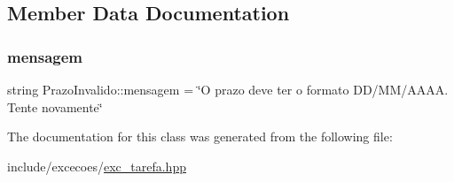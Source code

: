 \subsection{Member Data Documentation}
\mbox{\label{classPrazoInvalido_af2bb20a8cc0b09f0b348e0ea2f9d18e8}} 
\subsubsection{\texorpdfstring{mensagem}{mensagem}}
{\footnotesize\ttfamily string Prazo\+Invalido\+::mensagem = \char`\"{}O prazo deve ter o formato \textquotesingle{}DD/MM/A\+A\+AA\textquotesingle{}. Tente novamente\char`\"{}\hspace{0.3cm}{\ttfamily [private]}}



The documentation for this class was generated from the following file\+:\begin{DoxyCompactItemize}
\item 
include/excecoes/\hyperlink{exc__tarefa_8hpp}{exc\+\_\+tarefa.\+hpp}\end{DoxyCompactItemize}

